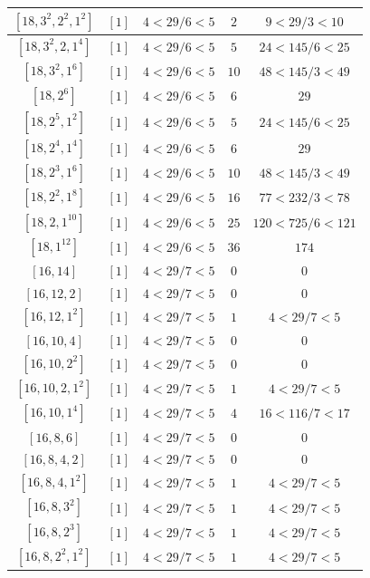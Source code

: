 \documentclass{article}%
\begin{document}
\begin{center}
\begin{longtable}{||c|c|c|c|c||}
$[18, 3^{2}, 2^{2}, 1^{2}]$ & $[1]$ & $4 < 29/6 < 5$ & $2$ & $9 < 29/3 < 10$ \\ \hline 
$[18, 3^{2}, 2, 1^{4}]$ & $[1]$ & $4 < 29/6 < 5$ & $5$ & $24 < 145/6 < 25$ \\ \hline 
$[18, 3^{2}, 1^{6}]$ & $[1]$ & $4 < 29/6 < 5$ & $10$ & $48 < 145/3 < 49$ \\ \hline 
$[18, 2^{6}]$ & $[1]$ & $4 < 29/6 < 5$ & $6$ & $29$ \\ \hline 
$[18, 2^{5}, 1^{2}]$ & $[1]$ & $4 < 29/6 < 5$ & $5$ & $24 < 145/6 < 25$ \\ \hline 
$[18, 2^{4}, 1^{4}]$ & $[1]$ & $4 < 29/6 < 5$ & $6$ & $29$ \\ \hline 
$[18, 2^{3}, 1^{6}]$ & $[1]$ & $4 < 29/6 < 5$ & $10$ & $48 < 145/3 < 49$ \\ \hline 
$[18, 2^{2}, 1^{8}]$ & $[1]$ & $4 < 29/6 < 5$ & $16$ & $77 < 232/3 < 78$ \\ \hline 
$[18, 2, 1^{10}]$ & $[1]$ & $4 < 29/6 < 5$ & $25$ & $120 < 725/6 < 121$ \\ \hline 
$[18, 1^{12}]$ & $[1]$ & $4 < 29/6 < 5$ & $36$ & $174$ \\ \hline 
$[16, 14]$ & $[1]$ & $4 < 29/7 < 5$ & $0$ & $0$ \\ \hline 
$[16, 12, 2]$ & $[1]$ & $4 < 29/7 < 5$ & $0$ & $0$ \\ \hline 
$[16, 12, 1^{2}]$ & $[1]$ & $4 < 29/7 < 5$ & $1$ & $4 < 29/7 < 5$ \\ \hline 
$[16, 10, 4]$ & $[1]$ & $4 < 29/7 < 5$ & $0$ & $0$ \\ \hline 
$[16, 10, 2^{2}]$ & $[1]$ & $4 < 29/7 < 5$ & $0$ & $0$ \\ \hline 
$[16, 10, 2, 1^{2}]$ & $[1]$ & $4 < 29/7 < 5$ & $1$ & $4 < 29/7 < 5$ \\ \hline 
$[16, 10, 1^{4}]$ & $[1]$ & $4 < 29/7 < 5$ & $4$ & $16 < 116/7 < 17$ \\ \hline 
$[16, 8, 6]$ & $[1]$ & $4 < 29/7 < 5$ & $0$ & $0$ \\ \hline 
$[16, 8, 4, 2]$ & $[1]$ & $4 < 29/7 < 5$ & $0$ & $0$ \\ \hline 
$[16, 8, 4, 1^{2}]$ & $[1]$ & $4 < 29/7 < 5$ & $1$ & $4 < 29/7 < 5$ \\ \hline 
$[16, 8, 3^{2}]$ & $[1]$ & $4 < 29/7 < 5$ & $1$ & $4 < 29/7 < 5$ \\ \hline 
$[16, 8, 2^{3}]$ & $[1]$ & $4 < 29/7 < 5$ & $1$ & $4 < 29/7 < 5$ \\ \hline 
$[16, 8, 2^{2}, 1^{2}]$ & $[1]$ & $4 < 29/7 < 5$ & $1$ & $4 < 29/7 < 5$ \\ \hline 

\end{longtable}
\end{center}
\end{document}
